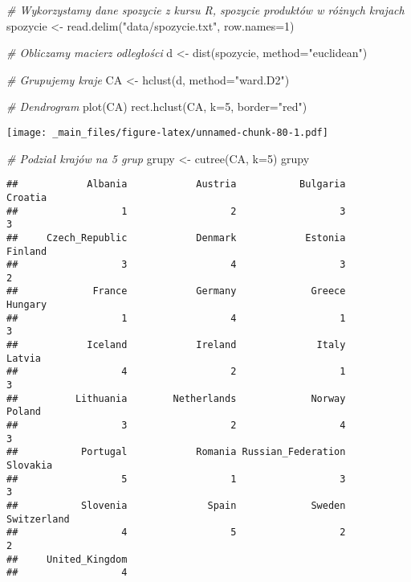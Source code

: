 \documentclass[
]{book}
\newenvironment{Shaded}{\begin{snugshade}}{\end{snugshade}}
\newcommand{\AttributeTok}[1]{\textcolor[rgb]{0.77,0.63,0.00}{#1}}
\newcommand{\CommentTok}[1]{\textcolor[rgb]{0.56,0.35,0.01}{\textit{#1}}}
\newcommand{\DecValTok}[1]{\textcolor[rgb]{0.00,0.00,0.81}{#1}}
\newcommand{\FunctionTok}[1]{\textcolor[rgb]{0.00,0.00,0.00}{#1}}
\newcommand{\NormalTok}[1]{#1}
\newcommand{\OtherTok}[1]{\textcolor[rgb]{0.56,0.35,0.01}{#1}}
\newcommand{\StringTok}[1]{\textcolor[rgb]{0.31,0.60,0.02}{#1}}
\begin{document}
\begin{Shaded}
\begin{Highlighting}[]
\CommentTok{\# Wykorzystamy dane spozycie z kursu R, spozycie produktów w różnych krajach }
\NormalTok{spozycie }\OtherTok{\textless{}{-}} \FunctionTok{read.delim}\NormalTok{(}\StringTok{"data/spozycie.txt"}\NormalTok{, }\AttributeTok{row.names=}\DecValTok{1}\NormalTok{)}

\CommentTok{\# Obliczamy macierz odległości}
\NormalTok{d }\OtherTok{\textless{}{-}} \FunctionTok{dist}\NormalTok{(spozycie, }\AttributeTok{method=}\StringTok{"euclidean"}\NormalTok{)}

\CommentTok{\# Grupujemy kraje}
\NormalTok{CA }\OtherTok{\textless{}{-}} \FunctionTok{hclust}\NormalTok{(d, }\AttributeTok{method=}\StringTok{"ward.D2"}\NormalTok{) }

\CommentTok{\# Dendrogram}
\FunctionTok{plot}\NormalTok{(CA)}
\FunctionTok{rect.hclust}\NormalTok{(CA, }\AttributeTok{k=}\DecValTok{5}\NormalTok{, }\AttributeTok{border=}\StringTok{"red"}\NormalTok{) }
\end{Highlighting}
\end{Shaded}

\texttt{[image: \_main\_files/figure-latex/unnamed-chunk-80-1.pdf]}

\begin{Shaded}
\begin{Highlighting}[]
\CommentTok{\# Podział krajów na 5 grup}
\NormalTok{grupy }\OtherTok{\textless{}{-}} \FunctionTok{cutree}\NormalTok{(CA, }\AttributeTok{k=}\DecValTok{5}\NormalTok{)}
\NormalTok{grupy}
\end{Highlighting}
\end{Shaded}

\begin{verbatim}
##            Albania            Austria           Bulgaria            Croatia 
##                  1                  2                  3                  3 
##     Czech_Republic            Denmark            Estonia            Finland 
##                  3                  4                  3                  2 
##             France            Germany             Greece            Hungary 
##                  1                  4                  1                  3 
##            Iceland            Ireland              Italy             Latvia 
##                  4                  2                  1                  3 
##          Lithuania        Netherlands             Norway             Poland 
##                  3                  2                  4                  3 
##           Portugal            Romania Russian_Federation           Slovakia 
##                  5                  1                  3                  3 
##           Slovenia              Spain             Sweden        Switzerland 
##                  4                  5                  2                  2 
##     United_Kingdom 
##                  4
\end{verbatim}
\end{document}
